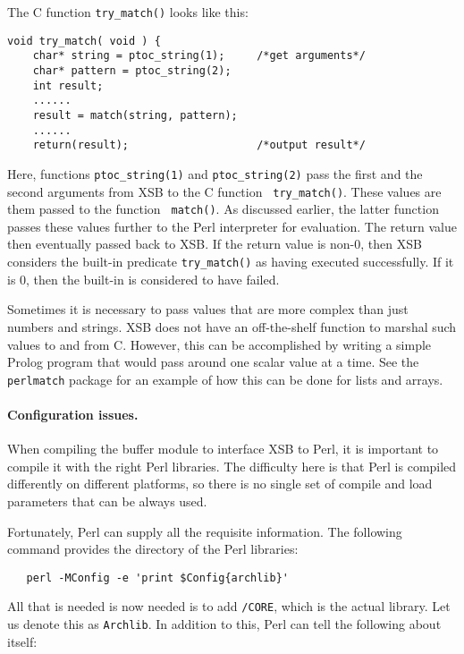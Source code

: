 \documentclass{article}
\begin{document}
{The C function \verb|try_match()| looks like this:

\begin{verbatim}
void try_match( void ) {
    char* string = ptoc_string(1);     /*get arguments*/
    char* pattern = ptoc_string(2);
    int result;
    ......
    result = match(string, pattern);
    ......
    return(result);                    /*output result*/
\end{verbatim}



Here, functions {\tt ptoc\_string(1)} and {\tt ptoc\_string(2)} pass the
first and the second arguments from XSB to the C function {\tt
  try\_match()}. These values are them passed to the function {\tt
  match()}.  As discussed earlier, the latter function passes these values
further to the Perl interpreter for evaluation. The return value then
eventually passed back to XSB. If the return value is non-0, then XSB
considers the built-in predicate {\tt try\_match()} as having executed
successfully. If it is 0, then the built-in is considered to have failed.


Sometimes it is necessary to pass values that are more complex than just
numbers and strings. XSB does not have an off-the-shelf function to marshal
such values to and from C. However, this can be accomplished by writing a
simple Prolog program that would pass around one scalar value at a time.
See the {\tt perlmatch} package for an example of how this can be done for
lists and arrays. 

\paragraph{Configuration issues.}
When compiling the buffer module to interface XSB to Perl, it is important
to compile it with the right Perl libraries. The difficulty here is that
Perl is compiled differently on different platforms, so there is no single
set of compile and load parameters that can be always used.

Fortunately, Perl can supply all the requisite information.
The following command provides the directory of the Perl libraries:

\begin{verbatim}
   perl -MConfig -e 'print $Config{archlib}'
\end{verbatim}

All that is needed is now needed is to add {\tt /CORE}, which is the actual
library. Let us denote this as {\tt Archlib}.  In addition to this, Perl
can tell the following about itself:

}
\end{document}
